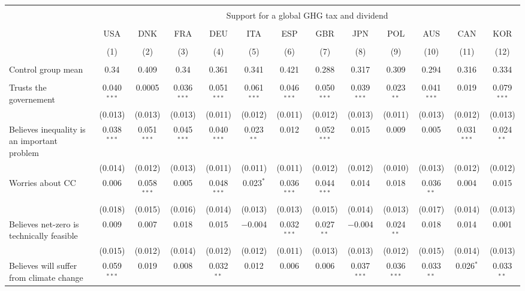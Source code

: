 
\begin{tabular}{@{\extracolsep{5pt}}lcccccccccccc} 
\\[-1.8ex]\hline 
\hline \\[-1.8ex] 
 & \multicolumn{12}{c}{Support for a global GHG tax and dividend} \\ 
\cline{2-13} 
\\[-1.8ex] & USA & DNK & FRA & DEU & ITA & ESP & GBR & JPN & POL & AUS & CAN & KOR \\ 
\\[-1.8ex] & (1) & (2) & (3) & (4) & (5) & (6) & (7) & (8) & (9) & (10) & (11) & (12)\\ 
\hline \\[-1.8ex] 
Control group mean & 0.34 & 0.409 & 0.34 & 0.361 & 0.341 & 0.421 & 0.288 & 0.317 & 0.309 & 0.294 & 0.316 & 0.334  \\ \hline \\[-1.8ex]
 Trusts the governement & 0.040$^{***}$ & 0.0005 & 0.036$^{***}$ & 0.051$^{***}$ & 0.061$^{***}$ & 0.046$^{***}$ & 0.050$^{***}$ & 0.039$^{***}$ & 0.023$^{**}$ & 0.041$^{***}$ & 0.019 & 0.079$^{***}$ \\ 
  & (0.013) & (0.013) & (0.013) & (0.011) & (0.012) & (0.011) & (0.012) & (0.013) & (0.011) & (0.013) & (0.012) & (0.013) \\ 
  Believes inequality is an important problem & 0.038$^{***}$ & 0.051$^{***}$ & 0.045$^{***}$ & 0.040$^{***}$ & 0.023$^{**}$ & 0.012 & 0.052$^{***}$ & 0.015 & 0.009 & 0.005 & 0.031$^{***}$ & 0.024$^{**}$ \\ 
  & (0.014) & (0.012) & (0.013) & (0.011) & (0.011) & (0.011) & (0.012) & (0.012) & (0.010) & (0.013) & (0.012) & (0.012) \\ 
  Worries about CC & 0.006 & 0.058$^{***}$ & 0.005 & 0.048$^{***}$ & 0.023$^{*}$ & 0.036$^{***}$ & 0.044$^{***}$ & 0.014 & 0.018 & 0.036$^{**}$ & 0.004 & 0.015 \\ 
  & (0.018) & (0.015) & (0.016) & (0.014) & (0.013) & (0.013) & (0.015) & (0.014) & (0.013) & (0.017) & (0.014) & (0.013) \\ 
  Believes net-zero is technically feasible & 0.009 & 0.007 & 0.018 & 0.015 & $-$0.004 & 0.032$^{***}$ & 0.027$^{**}$ & $-$0.004 & 0.024$^{**}$ & 0.018 & 0.014 & 0.001 \\ 
  & (0.015) & (0.012) & (0.014) & (0.012) & (0.012) & (0.011) & (0.013) & (0.013) & (0.012) & (0.015) & (0.014) & (0.013) \\ 
  Believes will suffer from climate change & 0.059$^{***}$ & 0.019 & 0.008 & 0.032$^{**}$ & 0.012 & 0.006 & 0.006 & 0.037$^{***}$ & 0.036$^{***}$ & 0.033$^{**}$ & 0.026$^{*}$ & 0.033$^{**}$ \\ 

\end{tabular}
